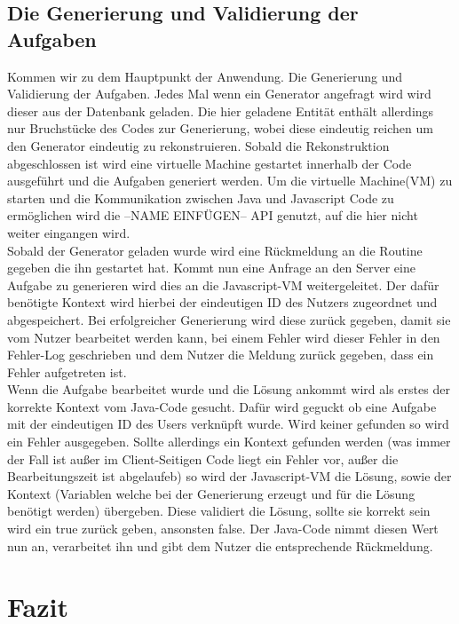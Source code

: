 \section{Die Generierung und Validierung der Aufgaben}

Kommen wir zu dem Hauptpunkt der Anwendung. Die Generierung und Validierung der Aufgaben. Jedes Mal wenn ein Generator angefragt wird wird dieser aus der Datenbank geladen. Die hier geladene Entität enthält allerdings nur Bruchstücke des Codes zur Generierung, wobei diese eindeutig reichen um den Generator eindeutig zu rekonstruieren. Sobald die Rekonstruktion abgeschlossen ist wird eine virtuelle Machine gestartet innerhalb der Code ausgeführt und die Aufgaben generiert werden. Um die virtuelle Machine(VM) zu starten und die Kommunikation zwischen Java und Javascript Code zu ermöglichen wird die --NAME EINFÜGEN-- API genutzt, auf die hier nicht weiter eingangen wird. \\

Sobald der Generator geladen wurde wird eine Rückmeldung an die Routine gegeben die ihn gestartet hat. Kommt nun eine Anfrage an den Server eine Aufgabe zu generieren wird dies an die Javascript-VM weitergeleitet. Der dafür benötigte Kontext wird hierbei der eindeutigen ID des Nutzers zugeordnet und abgespeichert. Bei erfolgreicher Generierung wird diese zurück gegeben, damit sie vom Nutzer bearbeitet werden kann, bei einem Fehler wird dieser Fehler in den Fehler-Log geschrieben und dem Nutzer die Meldung zurück gegeben, dass ein Fehler aufgetreten ist. \\

Wenn die Aufgabe bearbeitet wurde und die Lösung ankommt wird als erstes der korrekte Kontext vom Java-Code gesucht. Dafür wird geguckt ob eine Aufgabe mit der eindeutigen ID des Users verknüpft wurde. Wird keiner gefunden so wird ein Fehler ausgegeben. Sollte allerdings ein Kontext gefunden werden (was immer der Fall ist außer im Client-Seitigen Code liegt ein Fehler vor, außer die Bearbeitungszeit ist abgelaufeb) so wird der Javascript-VM die Lösung, sowie der Kontext (Variablen welche bei der Generierung erzeugt und für die Lösung benötigt werden) übergeben. Diese validiert die Lösung, sollte sie korrekt sein wird ein true zurück geben, ansonsten false. Der Java-Code nimmt diesen Wert nun an, verarbeitet ihn und gibt dem Nutzer die entsprechende Rückmeldung.


\chapter{Fazit}




